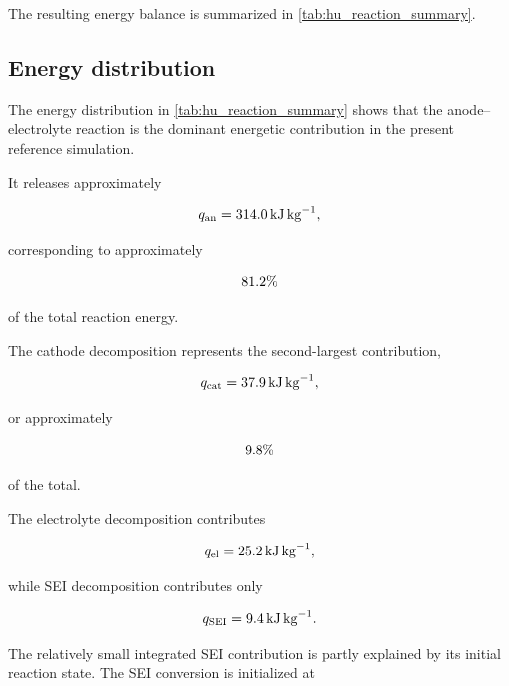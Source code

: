 The resulting energy balance is summarized in
\cref{tab:hu_reaction_summary}.



\subsection{Energy distribution}

The energy distribution in
\cref{tab:hu_reaction_summary}
shows that the anode--electrolyte reaction is the dominant energetic
contribution in the present reference simulation.

It releases approximately

\begin{equation}
    q_{\mathrm{an}}
    =
    \SI{314.0}{\kilo\joule\per\kilogram},
\end{equation}

corresponding to approximately

\begin{equation}
    81.2\%
\end{equation}

of the total reaction energy.

The cathode decomposition represents the second-largest contribution,

\begin{equation}
    q_{\mathrm{cat}}
    =
    \SI{37.9}{\kilo\joule\per\kilogram},
\end{equation}

or approximately

\begin{equation}
    9.8\%
\end{equation}

of the total.

The electrolyte decomposition contributes

\begin{equation}
    q_{\mathrm{el}}
    =
    \SI{25.2}{\kilo\joule\per\kilogram},
\end{equation}

while SEI decomposition contributes only

\begin{equation}
    q_{\mathrm{SEI}}
    =
    \SI{9.4}{\kilo\joule\per\kilogram}.
\end{equation}

The relatively small integrated SEI contribution is partly explained
by its initial reaction state. The SEI conversion is initialized at


